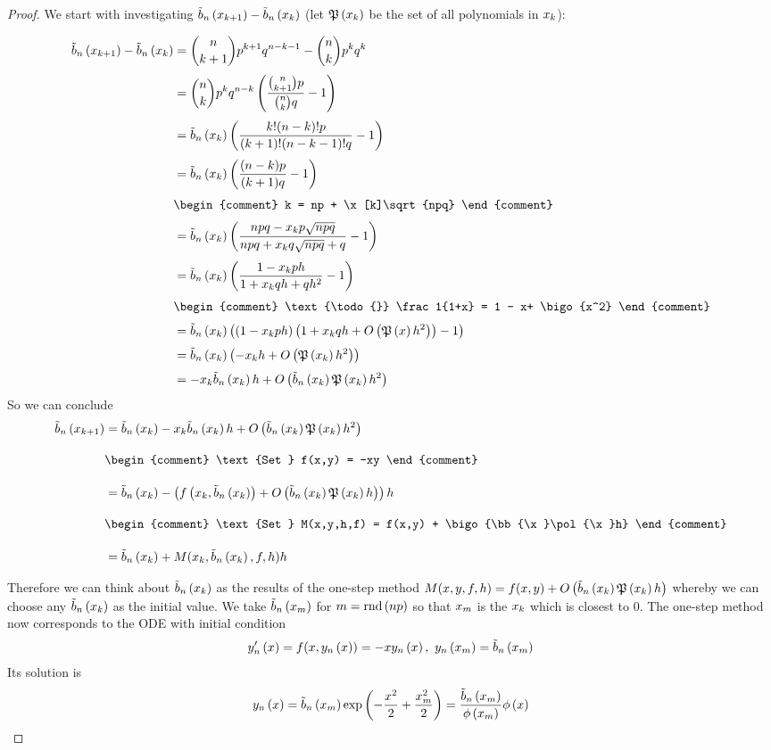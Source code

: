 \begin{proof}
  We start with investigating $\bb{\x[k+1]}-\bb{\x[k]}$ (let $\pol{\x}$ be the set of all polynomials in $\x$):

  \begin{align}
    \bb{\x[k+1]} - \bb{\x[k]} &= \binom n{k+1} p^{k+1}q^{n-k-1} - \binom nk p^k q^k \nl
    &= \binom nk p^k q^{n-k} \br{\frac{\binom n{k+1}p}{\binom nk q} -1} \nl
    &= \bb{\x[k]} \br{\frac{k! (n-k)! p}{(k+1)!(n-k-1)! q} -1} \nl
    &= \bb{\x[k]} \br{\frac{(n-k)p}{(k+1)q}-1} \nl
    &
    \begin{comment}
      k = np + \x[k]\sqrt{npq}
    \end{comment} \nl
    &= \bb{\x[k]} \br{\frac{npq-\x[k]p\sqrt{npq}}{npq + \x[k]q\sqrt{npq}+q}-1} \nl
    &= \bb{\x[k]} \br{\frac{1-\x[k]ph}{1+\x[k]qh+qh^2}-1} \nl
    &
    \begin{comment}
      \text{\todo{}} \frac1{1+x} = 1 - x+ \bigo{x^2}
    \end{comment} \nl
    &= \bb{\x[k]} \br{\br{1-\x[k]ph}\br{1+\x[k]qh + \bigo{\pol{x}h^2}}-1} \nl
    &= \bb{\x[k]} \br{-\x[k]h + \bigo{\pol{\x}h^2}} \nl
    &= -\x[k]\bb{\x}h + \bigo{\bb{\x}\pol{\x}h^2}
  \end{align}
  So we can conclude
  \begin{align}
    \bb{\x[k+1]} &= \bb{\x[k]} -\x[k]\bb{\x[k]} h + \bigo{\bb{\x}\pol{\x}h^2} \bnl
    &
    \begin{comment}
      \text{Set } f(x,y) = -xy
    \end{comment} \bnl
    &= \bb{\x[k]} - \br{\f{\x[k], \bb{\x[k]}} + \bigo{\bb{\x}\pol{\x}h}}h \bnl
    &
    \begin{comment}
      \text{Set } M(x,y,h,f) = f(x,y) + \bigo{\bb{\x}\pol{\x}h}
    \end{comment} \bnl
    &= \bb{\x[k]} + M(\x[k], \bb{\x[k]}, f, h) h
  \end{align}

  Therefore we can think about $\bb{\x}$ as the results of the one-step method $M(x,y,f,h)=f(x,y)+\bigo{\bb{\x}\pol{\x}h}$ whereby we can choose any $\bb{\x}$ as the initial value. We take $\bb{\xnp}$ for $\knp=\rnd{np}$ so that $\xnp$ is the $\x$ which is closest to $0$. The one-step method now corresponds to the ODE with initial condition
  \begin{align}
    \dphin{x}=f(x,\phin{x})=-x\phin{x},\ \phin{\xnp} = \bb{\xnp}
  \end{align}
  Its solution is
  \begin{align}
    \phin{x} = \bb{\xnp}\fexp{-\frac{x^2}2+\frac{\xnp^2}2} = \frac{\bb{\xnp}}{\fphi{\xnp}} \fphi{x}
  \end{align}


\end{proof}
